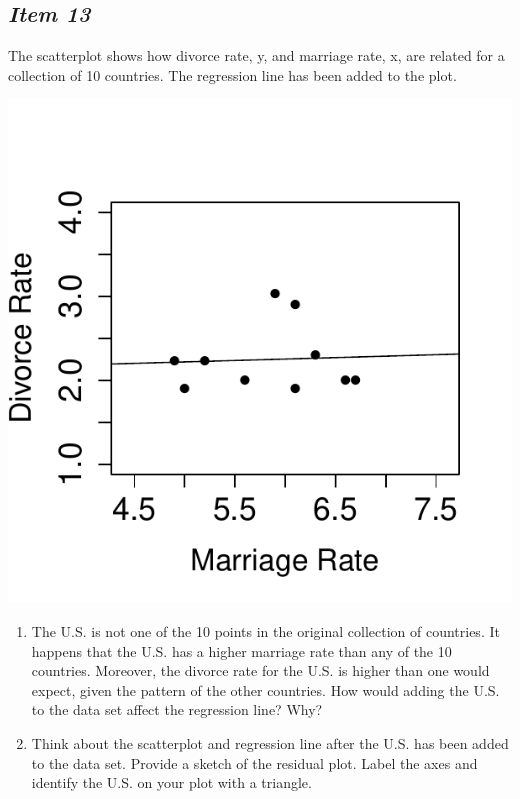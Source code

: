 \documentclass[twoside,openany]{tufte-book}
\begin{document}
\subsection{\textbf{\textit{Item 13}}}
The scatterplot shows how divorce rate, y, and marriage rate, x, are related for a collection of 10 countries.  The regression line has been added to the plot.

\begin{marginfigure}
\centering
\includegraphics{Item13_R.pdf}
\end{marginfigure}

\begin{enumerate}[leftmargin=1cm, itemsep=.2em]
\item The U.S. is not one of the 10 points in the original collection of countries.  It happens that the U.S. has a higher marriage rate than any of the 10 countries.  Moreover, the divorce rate for the U.S. is higher than one would expect, given the pattern of the other countries.  How would adding the U.S. to the data set affect the regression line?  Why?
\item Think about the scatterplot and regression line after the U.S. has been added to the data set.  Provide a sketch of the residual plot.  Label the axes and identify the U.S. on your plot with a triangle.
\end{enumerate}
\end{document}
